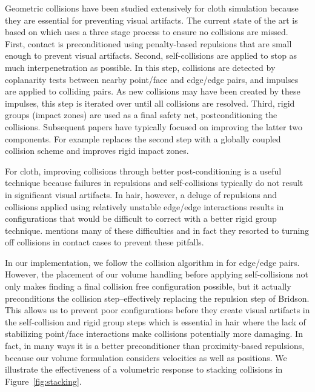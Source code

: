 Geometric collisions have been studied extensively for cloth simulation because
they are essential for preventing visual artifacts. The current state of the art
is based on \cite{bridson:2002:cloth} which uses a three stage process to ensure
no collisions are missed. First, contact is preconditioned using penalty-based
repulsions that are small enough to prevent visual artifacts. Second,
self-collisions are applied to stop as much interpenetration as
possible. In this step, collisions are detected by coplanarity tests
between nearby point/face and edge/edge pairs, and impulses are
applied to colliding pairs.  As new collisions may have been created
by these impulses, this step is iterated over until all collisions are
resolved. Third, rigid groups (impact zones) are used as a final safety net,
postconditioning the collisions. Subsequent papers have typically focused on
improving the latter two components. For example \cite{sifakis:2008:cloth}
replaces the second step with a globally coupled collision scheme and
\cite{harmon:2008:cloth} improves rigid impact zones.

For cloth, improving collisions through better post-conditioning is a useful
technique because failures in repulsions and self-collisions typically do not
result in significant visual artifacts.  In hair, however, a deluge of
repulsions and collisions applied using relatively unstable edge/edge
interactions results in configurations that would be difficult to correct with a
better rigid group technique.  \cite{selle:2008:hair} mentions many of these
difficulties and in fact they resorted to turning off collisions in contact
cases to prevent these pitfalls.

In our implementation, we follow the collision algorithm in
\cite{bridson:2002:cloth} for edge/edge pairs. However, the placement
of our volume handling before applying self-collisions not only makes
finding a final collision free configuration possible, but
it actually preconditions the collision step--effectively replacing the repulsion step of
Bridson.  This allows us to prevent poor configurations before they create
visual artifacts in the self-collision and rigid group steps which is essential
in hair where the lack of stabilizing point/face interactions make collisions
potentially more damaging.  In fact, in many ways it is a better preconditioner
than proximity-based repulsions, because our volume formulation considers
velocities as well as positions. We illustrate the effectiveness of a
volumetric response to stacking collisions in Figure~\ref{fig:stacking}. 

